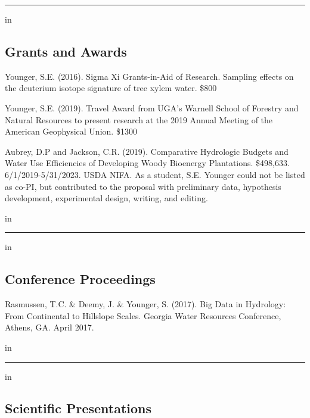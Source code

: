 \documentclass[10pt,letterpaper]{article}
\begin{document}
	\hrule
	\vspace{-0.4em}
	 in
	\subsection*{Grants and Awards}
	
	\begin{hangparas}{.25in}{1}
		
		Younger, S.E. (2016). Sigma Xi Grants-in-Aid of Research. Sampling effects on the deuterium isotope signature of tree xylem water. \$800
		
		Younger, S.E. (2019). Travel Award from UGA's Warnell School of Forestry and Natural Resources to present research at the 2019 Annual Meeting of the American Geophysical Union. \$1300
		
		Aubrey, D.P and Jackson, C.R. (2019). Comparative Hydrologic Budgets and Water Use Efficiencies of Developing Woody Bioenergy Plantations. \$498,633. 6/1/2019-5/31/2023. USDA NIFA. As a student, S.E. Younger could not be listed as co-PI, but contributed to the proposal with preliminary data, hypothesis development, experimental design, writing, and editing.
		
		\vspace{-0.4em}
		 in
		
	\end{hangparas}
	
	\hrule
	\vspace{-0.4em}
	 in
	\subsection*{Conference Proceedings}
	
	\begin{hangparas}{.25in}{1}
		
		Rasmussen, T.C. \& Deemy, J. \& Younger, S. (2017). Big Data in Hydrology: From Continental to Hillslope Scales. Georgia Water Resources Conference, Athens, GA. April 2017.
		
	\end{hangparas}
	
	 in
	
	
	\hrule
	\vspace{-0.4em}
	 in
	
	\subsection*{Scientific Presentations}
	
\end{document}

